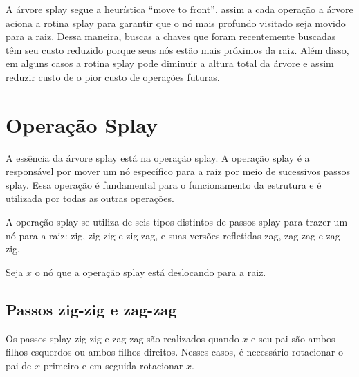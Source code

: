 A árvore splay segue a heurística “move to front”, assim a cada operação a árvore aciona a rotina splay para garantir que o nó mais profundo visitado seja movido para a raiz. Dessa maneira, buscas a chaves que foram recentemente buscadas têm seu custo reduzido porque seus nós estão mais próximos da raiz. Além disso, em alguns casos a rotina splay pode diminuir a altura total da árvore e assim reduzir custo de o pior custo de operações futuras.

{

\section{Operação Splay}

A essência da árvore splay está na operação splay. A operação splay é a responsável por mover um nó específico para a raiz por meio de sucessivos passos splay. Essa operação é fundamental para o funcionamento da estrutura e é utilizada por todas as outras operações.

A operação splay se utiliza de seis tipos distintos de passos splay para trazer um nó para a raiz: zig, zig-zig e zig-zag, e suas versões refletidas zag, zag-zag e zag-zig. 

Seja $x$ o nó que a operação splay está deslocando para a raiz.

\subsection{Passos zig-zig e zag-zag}

Os passos splay zig-zig e zag-zag são realizados quando $x$ e seu pai são ambos filhos esquerdos ou ambos filhos direitos. Nesses casos, é necessário rotacionar o pai de $x$ primeiro e em seguida rotacionar $x$.

\begin{figure}[H]
    \centering
    \begin{comment}
    \begin{tikzpicture}[
        ed/.style = {densely dashed, shorten >= 5pt},
        alpha/.style = {regular polygon, regular polygon sides=3, draw, minimum size=1.1cm, inner sep=2pt, anchor=south},
        level distance=1.5cm,
        sibling distance=0.25cm
        ]
        

\end{comment}
\end{figure}}
